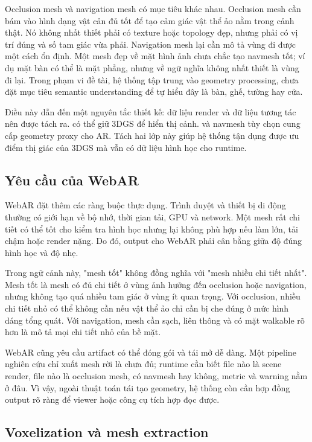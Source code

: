 Occlusion mesh và navigation mesh có mục tiêu khác nhau. Occlusion mesh cần bám vào hình dạng vật cản đủ tốt để tạo cảm giác vật thể ảo nằm trong cảnh thật. Nó không nhất thiết phải có texture hoặc topology đẹp, nhưng phải có vị trí đúng và số tam giác vừa phải. Navigation mesh lại cần mô tả vùng đi được một cách ổn định. Một mesh đẹp về mặt hình ảnh chưa chắc tạo navmesh tốt; ví dụ mặt bàn có thể là mặt phẳng, nhưng về ngữ nghĩa không nhất thiết là vùng đi lại. Trong phạm vi đề tài, hệ thống tập trung vào geometry processing, chưa đặt mục tiêu semantic understanding để tự hiểu đây là bàn, ghế, tường hay cửa.

Điều này dẫn đến một nguyên tắc thiết kế: dữ liệu render và dữ liệu tương tác nên được tách ra.  có thể giữ 3DGS để hiển thị cảnh.  và navmesh tùy chọn cung cấp geometry proxy cho AR. Tách hai lớp này giúp hệ thống tận dụng được ưu điểm thị giác của 3DGS mà vẫn có dữ liệu hình học cho runtime.

\subsection{Yêu cầu của WebAR}

WebAR đặt thêm các ràng buộc thực dụng. Trình duyệt và thiết bị di động thường có giới hạn về bộ nhớ, thời gian tải, GPU và network. Một mesh rất chi tiết có thể tốt cho kiểm tra hình học nhưng lại không phù hợp nếu làm  lớn, tải chậm hoặc render nặng. Do đó, output cho WebAR phải cân bằng giữa độ đúng hình học và độ nhẹ.

Trong ngữ cảnh này, "mesh tốt" không đồng nghĩa với "mesh nhiều chi tiết nhất". Mesh tốt là mesh có đủ chi tiết ở vùng ảnh hưởng đến occlusion hoặc navigation, nhưng không tạo quá nhiều tam giác ở vùng ít quan trọng. Với occlusion, nhiều chi tiết nhỏ có thể không cần nếu vật thể ảo chỉ cần bị che đúng ở mức hình dáng tổng quát. Với navigation, mesh cần sạch, liên thông và có mặt walkable rõ hơn là mô tả mọi chi tiết nhỏ của bề mặt.

WebAR cũng yêu cầu artifact có thể đóng gói và tái mở dễ dàng. Một pipeline nghiên cứu chỉ xuất mesh rời là chưa đủ; runtime cần biết file nào là scene render, file nào là occlusion mesh, có navmesh hay không, metric và warning nằm ở đâu. Vì vậy, ngoài thuật toán tái tạo geometry, hệ thống còn cần hợp đồng output rõ ràng để viewer hoặc công cụ tích hợp đọc được.

\subsection{Voxelization và mesh extraction}

